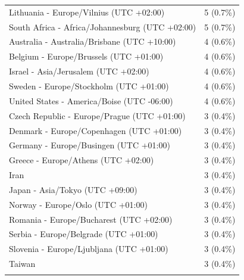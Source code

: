 \documentclass[
  english,
  man]{apa6}
\begin{document}
\begin{appendix}
\begin{table}
{\begin{tabular}[t]{ll}
\hspace{1em}Lithuania - Europe/Vilnius (UTC +02:00) & 5 (0.7\%)\\
\hspace{1em}South Africa - Africa/Johannesburg (UTC +02:00) & 5 (0.7\%)\\
\hspace{1em}Australia - Australia/Brisbane (UTC +10:00) & 4 (0.6\%)\\
\addlinespace
\hspace{1em}Belgium - Europe/Brussels (UTC +01:00) & 4 (0.6\%)\\
\hspace{1em}Israel - Asia/Jerusalem (UTC +02:00) & 4 (0.6\%)\\
\hspace{1em}Sweden - Europe/Stockholm (UTC +01:00) & 4 (0.6\%)\\
\hspace{1em}United States - America/Boise (UTC -06:00) & 4 (0.6\%)\\
\hspace{1em}Czech Republic - Europe/Prague (UTC +01:00) & 3 (0.4\%)\\
\addlinespace
\hspace{1em}Denmark - Europe/Copenhagen (UTC +01:00) & 3 (0.4\%)\\
\hspace{1em}Germany - Europe/Busingen (UTC +01:00) & 3 (0.4\%)\\
\hspace{1em}Greece - Europe/Athens (UTC +02:00) & 3 (0.4\%)\\
\hspace{1em}Iran & 3 (0.4\%)\\
\hspace{1em}Japan - Asia/Tokyo (UTC +09:00) & 3 (0.4\%)\\
\addlinespace
\hspace{1em}Norway - Europe/Oslo (UTC +01:00) & 3 (0.4\%)\\
\hspace{1em}Romania - Europe/Bucharest (UTC +02:00) & 3 (0.4\%)\\
\hspace{1em}Serbia - Europe/Belgrade (UTC +01:00) & 3 (0.4\%)\\
\hspace{1em}Slovenia - Europe/Ljubljana (UTC +01:00) & 3 (0.4\%)\\
\hspace{1em}Taiwan & 3 (0.4\%)\\
\addlinespace

\end{tabular}}
\end{table}
\end{appendix}
\end{document}
